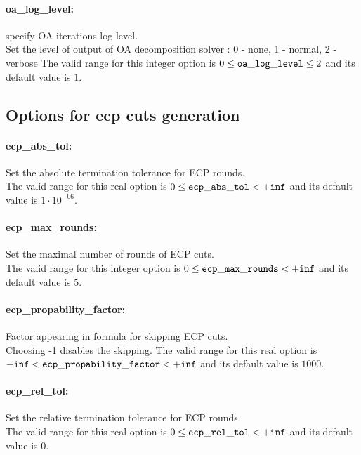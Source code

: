 \paragraph{oa\_log\_level:} specify OA iterations log level. $\;$ \\
 Set the level of output of OA decomposition
solver : 0 - none, 1 - normal, 2 - verbose The valid range for this integer option is
$0 \le {\tt oa\_log\_level } \le 2$
and its default value is $1$.


\subsection{Options for ecp cuts generation}
\label{sec:Options_for_ecp_cuts_generation}
\paragraph{ecp\_abs\_tol:} Set the absolute termination tolerance for ECP rounds. $\;$ \\
 The valid range for this real option is 
$0 \le {\tt ecp\_abs\_tol } <  {\tt +inf}$
and its default value is $1 \cdot 10^{-06}$.


\paragraph{ecp\_max\_rounds:} Set the maximal number of rounds of ECP cuts. $\;$ \\
 The valid range for this integer option is
$0 \le {\tt ecp\_max\_rounds } <  {\tt +inf}$
and its default value is $5$.


\paragraph{ecp\_propability\_factor:} Factor appearing in formula for skipping ECP cuts. $\;$ \\
 Choosing -1 disables the skipping. The valid range for this real option is 
${\tt -inf} <  {\tt ecp\_propability\_factor } <  {\tt +inf}$
and its default value is $1000$.


\paragraph{ecp\_rel\_tol:} Set the relative termination tolerance for ECP rounds. $\;$ \\
 The valid range for this real option is 
$0 \le {\tt ecp\_rel\_tol } <  {\tt +inf}$
and its default value is $0$.


